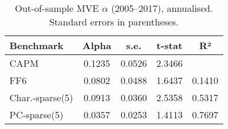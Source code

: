 \begin{table}
\caption{Out-of-sample MVE $\alpha$ (2005–2017), annualised. Standard errors in parentheses.}
\label{tab:table4_oos}
\begin{tabular}{lcccc}
\toprule
Benchmark & Alpha & s.e. & t-stat & R² \\
\midrule
CAPM & 0.1235 & 0.0526 & 2.3466 &  \\
FF6 & 0.0802 & 0.0488 & 1.6437 & 0.1410 \\
Char.-sparse(5) & 0.0913 & 0.0360 & 2.5358 & 0.5317 \\
PC-sparse(5) & 0.0357 & 0.0253 & 1.4113 & 0.7697 \\
\bottomrule
\end{tabular}
\end{table}
